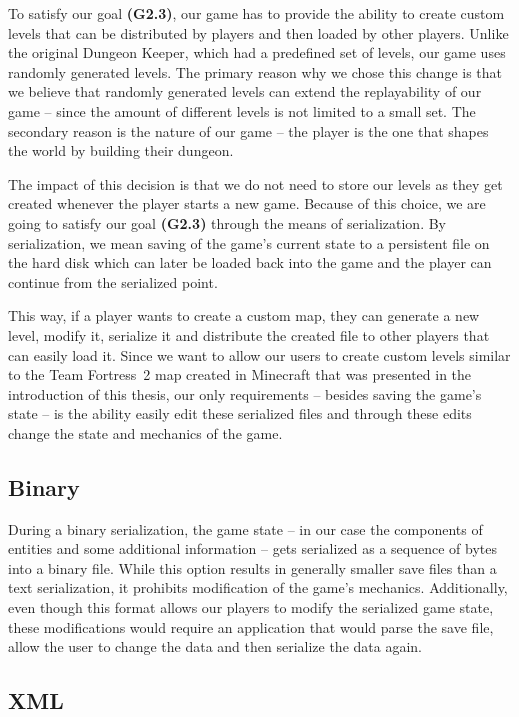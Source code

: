 To satisfy our goal \textbf{(G2.3)}, our game has to provide the ability to create custom levels that can be distributed by
players and then loaded by other players. Unlike the original Dungeon Keeper, which had a predefined set of levels, our game uses
randomly generated levels. The primary reason why we chose this change is that we believe that randomly generated levels can extend the
replayability of our game -- since the amount of different levels is not limited to a small set. The secondary reason is the nature of
our game -- the player is the one that shapes the world by building their dungeon.

The impact of this decision is that we do not need to store our levels as they get created whenever the player starts a new game. 
Because of this choice, we are going to satisfy our goal \textbf{(G2.3)} through the means of serialization. By serialization, we mean
saving of the game's current state to a persistent file on the hard disk which can later be loaded back into the game and the player
can continue from the serialized point.

This way, if a player wants to create a custom map, they can generate a new level, modify it, serialize it and distribute the created
file to other players that can easily load it. Since we want to allow our users to create custom levels similar to the Team Fortress~2
map created in Minecraft that was presented in the introduction of this thesis, our only requirements -- besides saving the game's state --
is the ability easily edit these serialized files and through these edits change the state and mechanics of the game.

\subsection{Binary}

During a binary serialization, the game state -- in our case the components of entities and some additional information -- gets
serialized as a sequence of bytes into a binary file. While this option results in generally smaller save files than a text serialization,
it prohibits modification of the game's mechanics. Additionally, even though this format allows our players to modify the
serialized game state, these modifications would require an application that would parse the save file, allow the user
to change the data and then serialize the data again.

\subsection{XML}

